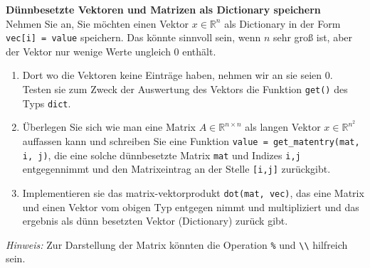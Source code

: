 \textbf{Dünnbesetzte Vektoren und Matrizen als Dictionary speichern}\\
Nehmen Sie an, Sie möchten einen Vektor $x \in \mathbb{R}^n$ als Dictionary in der Form \verb|vec[i] = value| speichern. Das könnte sinnvoll sein, wenn $n$ sehr groß ist, aber der Vektor nur wenige Werte ungleich 0 enthält.
\begin{enumerate}
	\item Dort wo die Vektoren keine Einträge haben, nehmen wir an sie seien 0. Testen sie zum Zweck der Auswertung des Vektors die Funktion \verb*|get()| des Typs \verb*|dict|.
	\item Überlegen Sie sich wie man eine Matrix $A \in \mathbb{R}^{n\times n}$ als langen Vektor $x \in \mathbb{R}^{n^2}$ auffassen kann und schreiben Sie eine Funktion \verb|value = get_matentry(mat, i, j)|, die eine solche dünnbesetzte Matrix \texttt{mat} und Indizes \texttt{i,j} entgegennimmt und den Matrixeintrag an der Stelle \texttt{[i,j]} zurückgibt.
	\item Implementieren sie das matrix-vektorprodukt \verb|dot(mat, vec)|, das eine Matrix und einen Vektor vom obigen Typ entgegen nimmt und multipliziert und das ergebnis als dünn besetzten Vektor (Dictionary) zurück gibt.
\end{enumerate}
\textit{Hinweis:} Zur Darstellung der Matrix könnten die Operation \verb*|%| und \verb|\\| hilfreich sein.